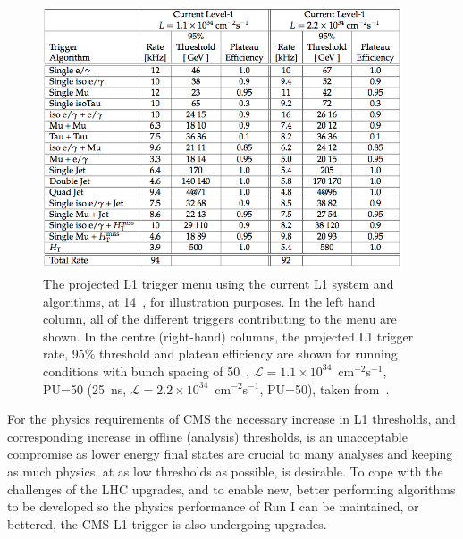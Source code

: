 \begin{figure}[htbp]
  \begin{center}
  \includegraphics[width=0.95\textwidth]{Figures/l1jets/triggerThresholdCurrentL1Table.png}
  \caption{The projected \ac{L1} trigger menu using the current \ac{L1} system and algorithms, at 14~\TeV, for illustration purposes. In the left hand column, all of the different triggers contributing to the menu are shown. In the centre (right-hand) columns, the projected L1 trigger rate, 95\% threshold and plateau efficiency are shown for running conditions with bunch spacing of 50~\ns, $\mathcal{L}=1.1 \times 10^{34}$~cm$^{-2}$s$^{-1}$, PU=50 (25~ns, $\mathcal{L}=2.2 \times 10^{34}$~cm$^{-2}$s$^{-1}$, PU=50), taken from~\cite{Tapper:1556311}.
}
  \label{tab:L1TrigMenuCurrentSystem}
  \end{center}
\end{figure}


For the physics requirements of \ac{CMS} the necessary increase in \ac{L1} thresholds, and corresponding increase in offline (analysis) thresholds, is an unacceptable compromise as lower energy final states are crucial to many analyses and keeping as much physics, at as low thresholds as possible, is desirable.
To cope with the challenges of the \ac{LHC} upgrades, and to enable new, better performing algorithms to be developed so the physics performance of Run I can be maintained, or bettered, the \ac{CMS} \ac{L1} trigger is also undergoing upgrades. 



